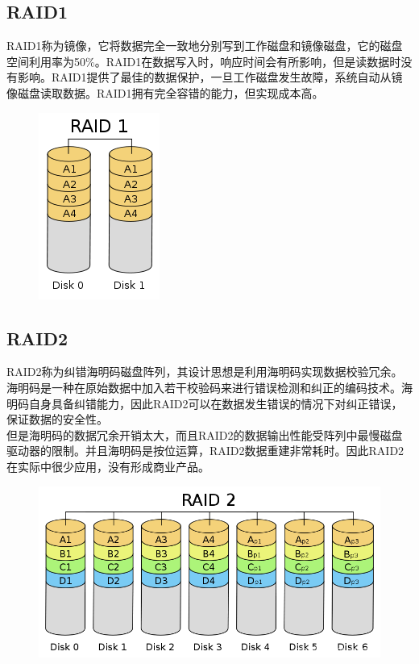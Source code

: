 \subsection{RAID1}

RAID1称为镜像，它将数据完全一致地分别写到工作磁盘和镜像磁盘，它的磁盘空间利用率为50\%。RAID1在数据写入时，响应时间会有所影响，但是读数据时没有影响。RAID1提供了最佳的数据保护，一旦工作磁盘发生故障，系统自动从镜像磁盘读取数据。RAID1拥有完全容错的能力，但实现成本高。

\begin{figure}[H]
    \centering
    \includegraphics[]{img/C4/4-5/2.png}
\end{figure}

\vspace{0.5cm}

\subsection{RAID2}

RAID2称为纠错海明码磁盘阵列，其设计思想是利用海明码实现数据校验冗余。海明码是一种在原始数据中加入若干校验码来进行错误检测和纠正的编码技术。海明码自身具备纠错能力，因此RAID2可以在数据发生错误的情况下对纠正错误，保证数据的安全性。\\

但是海明码的数据冗余开销太大，而且RAID2的数据输出性能受阵列中最慢磁盘驱动器的限制。并且海明码是按位运算，RAID2数据重建非常耗时。因此RAID2在实际中很少应用，没有形成商业产品。

\begin{figure}[H]
    \centering
    \includegraphics[scale=0.5]{img/C4/4-5/3.png}
\end{figure}

